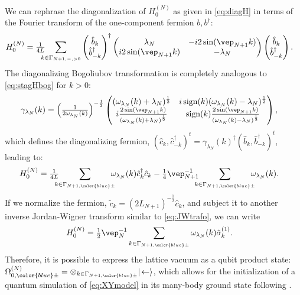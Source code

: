 \documentclass[a4paper, 11pt]{article}
\DeclareMathOperator{\1}{\mathds{1}}
\DeclareMathOperator{\sign}{\textup{sign}}
\begin{document}
We can rephrase the diagonalization of $H^{(N)}_{0}$ as given in \eqref{eq:diagH} in terms of the Fourier transform of the one-component fermion $b, b^{\dag}$:
\begin{align}
\label{eq:FstagH1c}
H^{(N)}_{0} & = \tfrac{1}{4L}\hspace{-0.25cm}\sum_{k\in\Gamma_{N+1,-,>0}}\begin{pmatrix} \hat{b}_{k} \\ \hat{b}^{\dag}_{-k} \end{pmatrix}^{\dagger} \begin{pmatrix} \lambda_{N} & -i2\sin(\vep_{N+1}k) \\ i2\sin(\vep_{N+1}k) & -\lambda_{N} \end{pmatrix} \begin{pmatrix} \hat{b}_{k} \\ \hat{b}^{\dag}_{-k} \end{pmatrix}.
\end{align}
The diagonalizing Bogoliubov transformation is completely analogous to \eqref{eq:stagHbog} for $k>0$:
\begin{align}
\label{eq:stagHbog1c}
\gamma_{\lambda_{N}}(k) & = \Big(\tfrac{1}{2\omega_{\lambda_{N}}(k)}\Big)^{-\frac{1}{2}}\begin{pmatrix} (\omega_{\lambda_{N}}(k)+\lambda_{N})^{\frac{1}{2}} & i\sign(k)(\omega_{\lambda_{N}}(k)-\lambda_{N})^{\frac{1}{2}} \\ i\frac{2\sin(\vep_{N+1}k)}{(\omega_{\lambda_{N}}(k)+\lambda_{N})^{\frac{1}{2}}} & \sign(k)\frac{2\sin(\vep_{N+1}k)}{(\omega_{\lambda_{N}}(k)-\lambda_{N})^{\frac{1}{2}}} \end{pmatrix},
\end{align}
which defines the diagonalizing fermion, $(\hat{c}_{k}, \hat{c}^{\dag}_{-k})^{t}=\gamma_{\lambda_{N}}(k)^{\dagger}(\hat{b}_{k}, \hat{b}^{\dag}_{-k})^{t}$,
leading to:
\begin{align}
\label{eq:diagH1c}
H^{(N)}_{0} & = \tfrac{1}{4L}\hspace{-0.25cm}\sum_{k\in\Gamma_{N+1,{\color{blue}\pm}}}\hspace{-0.25cm}\omega_{\lambda_{N}}(k)\hat{c}^{\dag}_{k}\hat{c}_{k} - \tfrac{1}{4}\vep_{N+1}^{-1}\hspace{-0.25cm}\sum_{k\in\Gamma_{N+1,{\color{blue}\pm}}}\hspace{-0.25cm}\omega_{\lambda_{N}}(k).
\end{align}
If we normalize the fermion, $\tilde{c}_{k} = (2L_{N+1})^{-\frac{1}{2}}\hat{c}_{k}$, and subject it to another inverse Jordan-Wigner transform similar to \eqref{eq:JWtrafo}, we can write
\begin{align}
\label{eq:diagH1cnorm}
H^{(N)}_{0} & = \tfrac{1}{2}\vep_{N}^{-1}\sum_{k\in\Gamma_{N+1,{\color{blue}\pm}}}\omega_{\lambda_{N}}(k)\tilde{\sigma}^{(1)}_{k}.
\end{align}
Therefore, it is possible to express the lattice vacuum as a qubit product state: $\Omega^{(N)}_{0,{\color{blue}\pm}}=\otimes_{k\in\Gamma_{N+1,{\color{blue}\pm}}}|\!\leftarrow\rangle$, which allows for the initialization of a quantum simulation of \eqref{eq:XYmodel} in its many-body ground state following \cite{VerstraeteQuantumCircuitsFor}.
\end{document}
